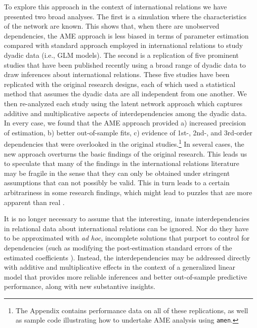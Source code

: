 To explore this approach in the context of international relations we have presented two broad analyses. The first is a simulation where the characteristics of the network are known. This shows that, when there are unobserved dependencies, the AME approach is less biased in terms of parameter estimation compared with standard approach employed in international relations to study dyadic data (i.e., GLM models). The second is a replication of five prominent studies that have been published recently using a broad range of dyadic data to draw inferences about international relations.  These five studies have been replicated with the original research designs, each of which used a statistical method that assumes the dyadic data are all independent from one another.  We then re-analyzed each study using the latent network approach which captures additive and multiplicative aspects of interdependencies among the dyadic data.  In every case, we found that the AME approach provided a) increased precision of estimation, b) better out-of-sample fits, c) evidence of 1st-, 2nd-, and 3rd-order dependencies that were overlooked in the original studies.\footnote{The Appendix contains performance data on all of these replications, as well as sample code illustrating how to undertake AME analysis using \texttt{amen}.} In several cases, the new approach overturns the basic findings of the original research.  This leads us to speculate that many of the findings in the international relations literature may be fragile in the sense that they can only be obtained under stringent assumptions that can not possibly be valid.  This in turn leads to a certain arbitrariness in some research findings, which might lead to puzzles that are more apparent than real \citep{zinnes:1980}.  

It is no longer necessary to assume that the interesting, innate interdependencies in relational data about international relations can be ignored. Nor do they have to be approximated with \textit{ad hoc}, incomplete solutions that purport to control for dependencies (such as modifying the post-estimation standard errors of the estimated coefficients \citep{king:roberts:2014}). Instead, the interdependencies may be addressed directly with additive and multiplicative effects in the context of a generalized linear model that provides more reliable inferences and better out-of-sample predictive performance, along with new substantive insights. 